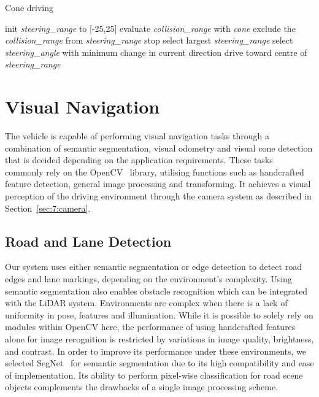\begin{algorithm}
	\begin{flushleft}
		\caption{Cone driving}\label{algo:7:cones}
		\begin{algorithmic}[1]
			\State init \textit{steering\_range} to [-25,25]
			\State evaluate \textit{collision\_range} with \textit{cone}
			\State exclude the \textit{collision\_range} from \textit{steering\_range}
			\EndFor
			\State stop
			\State select largest \textit{steering\_range}
			\State select \textit{steering\_angle} with minimum change in current direction
			\EndIf
			\State drive toward centre of \textit{steering\_range}
			\EndProcedure
		\end{algorithmic}
	\end{flushleft}
\end{algorithm}

\section{Visual Navigation}\label{sec:7:vision}
The vehicle is capable of performing visual navigation tasks through a combination of semantic segmentation, visual odometry and visual cone detection that is decided depending on the application requirements. These tasks commonly rely on the OpenCV~\cite{opencv_opencv_2016} library, utilising functions such as handcrafted feature detection, general image processing and transforming. It achieves a visual perception of the driving environment through the camera system as described in Section~\ref{sec:7:camera}.

\subsection{Road and Lane Detection}\label{semseg}
Our system uses either semantic segmentation or edge detection to detect road edges and lane markings, depending on the environment's complexity. Using semantic segmentation also enables obstacle recognition which can be integrated with the LiDAR system. Environments are complex when there is a lack of uniformity in pose, features and illumination. While it is possible to solely rely on modules within OpenCV here, the performance of using handcrafted features alone for image recognition is restricted by variations in image quality, brightness, and contrast. In order to improve its performance under these environments, we selected SegNet~\cite{badrinarayanan_segnet:_2017} for semantic segmentation due to its high compatibility and ease of implementation. Its ability to perform pixel-wise classification for road scene objects complements the drawbacks of a single image processing scheme.

